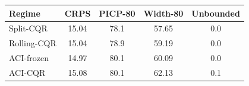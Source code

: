 \begin{tabular}{|l|c|c|c|c|}
\hline
Regime & CRPS & PICP-80 & Width-80 & Unbounded \\
\hline
Split-CQR & 15.04 & 78.1 & 57.65 & 0.0 \\
Rolling-CQR & 15.04 & 78.9 & 59.19 & 0.0 \\
ACI-frozen & 14.97 & 80.1 & 60.09 & 0.0 \\
ACI-CQR & 15.08 & 80.1 & 62.13 & 0.1 \\
\hline
\end{tabular}
